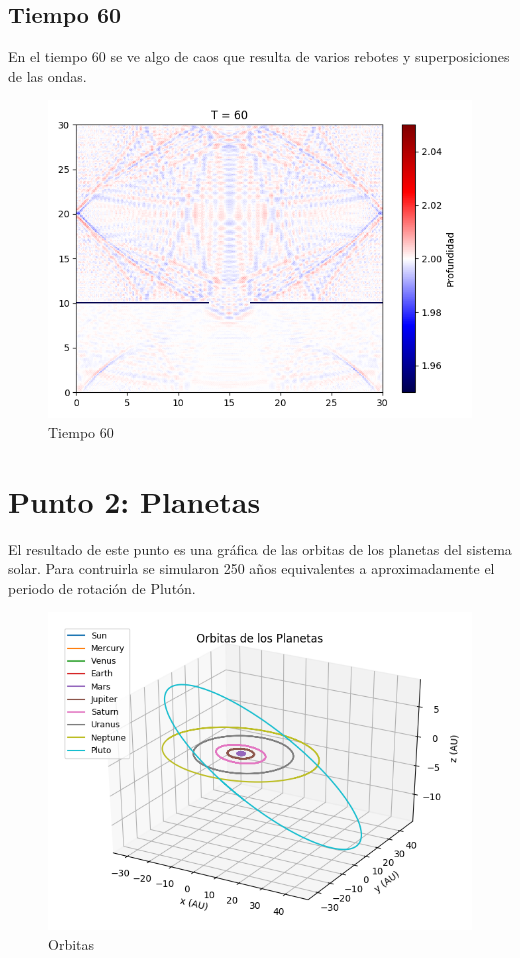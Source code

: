 \documentclass{article}
\begin{document}
\subsection{Tiempo 60}
En el tiempo 60 se ve algo de caos que resulta de varios rebotes y superposiciones de las ondas.
\begin{figure}[H]
\centering
\includegraphics[scale=0.5]{60.png}
\caption{Tiempo 60}
\end{figure}
\section{Punto 2: Planetas}
El resultado de este punto es una gráfica de las orbitas de los planetas del sistema solar. Para contruirla se simularon 250 años equivalentes a aproximadamente el periodo de rotación de Plutón.
\begin{figure}[H]
\centering
\includegraphics[scale=0.5]{orbitas.png}
\caption{Orbitas}
\end{figure}
\end{document}
